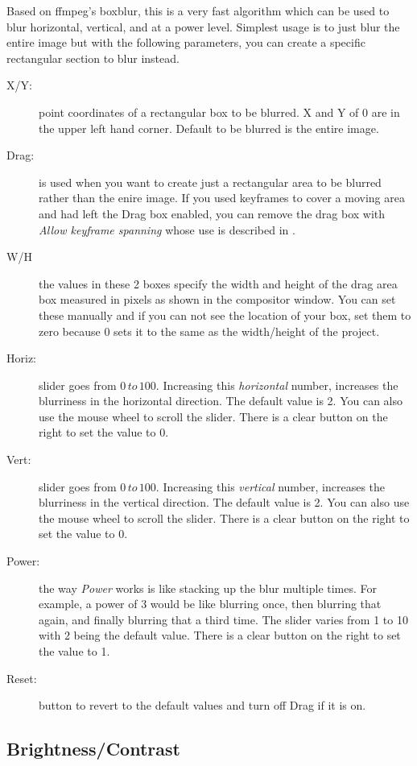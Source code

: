 Based on ffmpeg’s boxblur, this is a very fast algorithm which can be used to blur horizontal,
vertical, and at a power level.  Simplest usage is to just blur the entire image but with
the following parameters, you can create a specific rectangular section to blur instead.  

\begin{description}
    \item[X/Y:] point coordinates of a rectangular box to be blurred. X and Y of 0 are in the
upper left hand corner.  Default to be blurred is the entire image.
    \item[Drag:] is used when you want to create just a rectangular area to be blurred rather
than the enire image. If you used keyframes to cover a moving area and had left the Drag box
enabled, you can remove the drag box with \textit{Allow keyframe spanning} whose use is
described in .
    \item[W/H] the values in these 2 boxes specify the width and height of the drag area box
measured in pixels as shown in the compositor window. You can set these manually and if you
can not see the location of your box, set them to zero because $0$ sets it to the same as the
width/height of the project.
    \item[Horiz:] slider goes from $0\, to\, 100$. Increasing this \textit{horizontal} number,
increases the blurriness in the horizontal direction. The default value is 2. You can also use
the mouse wheel to scroll the slider.  There is a clear button on the right to set the value to 0.
    \item[Vert:] slider goes from $0\, to\, 100$. Increasing this \textit{vertical} number,
increases the blurriness in the vertical direction.  The default value is 2. You can also use
the mouse wheel to scroll the slider. There is a clear button on the right to set the value to 0.
    \item[Power:] the way \textit{Power} works is like stacking up the blur multiple times.
For example, a power of 3 would be like blurring once, then blurring that again, and finally
blurring that a third time. The slider varies from 1 to 10 with 2 being the default value. There
is a clear button on the right to set the value to 1.
    \item[Reset:] button to revert to the default values and turn off Drag if it is on.
\end{description}

\subsection{Brightness/Contrast}%
\label{sub:brightness_contrast}

